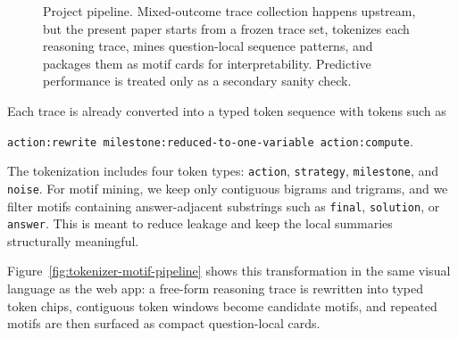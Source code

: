 \documentclass[11pt]{article}
\newcommand{\tok}[1]{\texttt{\small #1}}
\begin{document}
\begin{figure}[t]
\caption{Project pipeline. Mixed-outcome trace collection happens upstream, but the present paper starts from a frozen trace set, tokenizes each reasoning trace, mines question-local sequence patterns, and packages them as motif cards for interpretability. Predictive performance is treated only as a secondary sanity check.}
\label{fig:pipeline}
\end{figure}

Each trace is already converted into a typed token sequence with tokens such as
\begin{center}
\tok{action:rewrite milestone:reduced-to-one-variable action:compute}.
\end{center}
The tokenization includes four token types: \tok{action}, \tok{strategy}, \tok{milestone}, and \tok{noise}. For motif mining, we keep only contiguous bigrams and trigrams, and we filter motifs containing answer-adjacent substrings such as \tok{final}, \tok{solution}, or \tok{answer}. This is meant to reduce leakage and keep the local summaries structurally meaningful.

Figure~\ref{fig:tokenizer-motif-pipeline} shows this transformation in the same visual language as the web app: a free-form reasoning trace is rewritten into typed token chips, contiguous token windows become candidate motifs, and repeated motifs are then surfaced as compact question-local cards.
\end{document}
